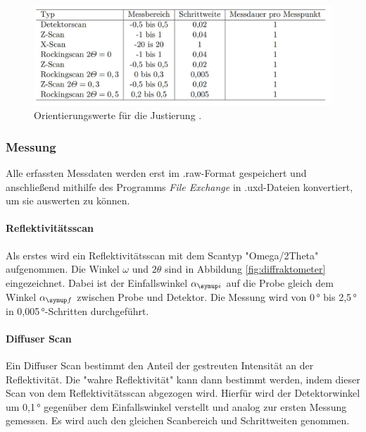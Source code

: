 \begin{figure}[H]
  \centering
  \includegraphics[scale=0.35]{table.JPG}
  \caption{Orientierungswerte für die Justierung \cite{V44}.}
  \label{tab:justage}
\end{figure}











\subsubsection{Messung}
Alle erfassten Messdaten werden erst im .raw-Format gespeichert und anschließend 
mithilfe des Programms \textit{File Exchange} in .uxd-Dateien konvertiert, um sie auswerten zu können.

\paragraph{Reflektivitätsscan}
Als erstes wird ein Reflektivitätsscan mit dem Scantyp "Omega/2Theta" aufgenommen. Die Winkel $\omega$ und $2\theta$ sind in 
Abbildung \ref{fig:diffraktometer} eingezeichnet.
Dabei ist der Einfallswinkel $\alpha\idx{i}$ auf die Probe gleich dem Winkel $\alpha\idx{f}$ zwischen Probe und Detektor.
Die Messung wird von 0\,° bis 2,5\,° in 0,005\,°-Schritten durchgeführt.

\paragraph{Diffuser Scan}
Ein Diffuser Scan bestimmt den Anteil der gestreuten Intensität an der Reflektivität. Die "wahre Reflektivität"
kann dann bestimmt werden, indem dieser Scan von dem Reflektivitätsscan abgezogen wird.
Hierfür wird der Detektorwinkel um 0,1\,° gegenüber dem Einfallswinkel verstellt und analog zur ersten Messung gemessen.
Es wird auch den gleichen Scanbereich und Schrittweiten genommen.






